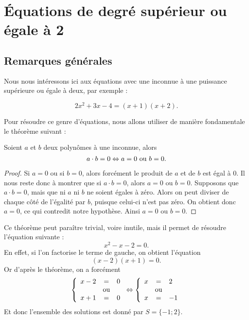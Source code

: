 \chapter[\'Equations de degré $\geq$ 2]{\'Equations de degré supérieur ou égale à 2}

\section{Remarques générales}

Nous nous intéressons ici aux équations avec une inconnue à une puissance supérieure ou égale à deux, par exemple :

$$
2x^2 +3x -4 = (x+1)(x+2).
$$

Pour résoudre ce genre d'équations, nous allons utiliser de manière fondamentale le théorème suivant :

\begin{theoreme}\label{fondamental}
Soient $a$ et $b$ deux polynômes à une inconnue, alors 
$$
a\cdot b = 0 \Leftrightarrow a = 0 \mbox{ ou } b=0.
$$
\end{theoreme}

\begin{proof}
Si $a=0$ ou si $b = 0$, alors forcément le produit de $a$ et de $b$ est égal à $0$. Il nous reste donc à montrer que si $a\cdot b = 0$, alors $a=0$ ou $b=0$. Supposons que $a\cdot b =0$, mais que ni $a$ ni $b$ ne soient égales à zéro. Alors on peut diviser de chaque côté de l'égalité par $b$, puisque celui-ci n'est pas zéro. On obtient donc $a=0$, ce qui contredit notre hypothèse. Ainsi $a=0$ ou $b=0$.
\end{proof}

\begin{exemple}
Ce théorème peut paraître trivial, voire inutile, mais il permet de résoudre l'équation suivante :
$$
x^2 -x -2 =0.
$$
En effet, si l'on factorise le terme de gauche, on obtient l'équation 
$$
(x-2)(x+1)=0.
$$
Or d'après le théorème, on a forcément
$$
\left\{
\begin{array}{lcl}
x-2 &=& 0\\
&\mbox{ou}&\\
x+1 &=& 0
\end{array}
\right.
\Leftrightarrow
\left\{
\begin{array}{lcl}
x&=&2\\
&\mbox{ou}&\\
x&=&-1
\end{array}
\right.
$$
Et donc l'ensemble des solutions est donné par $S=\{-1;2\}$.
\end{exemple}

